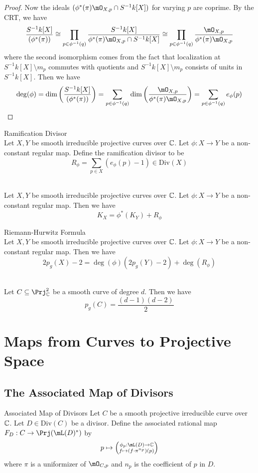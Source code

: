 \documentclass[a4paper]{article}
\begin{document}
\begin{prp}{}{}
\begin{proof}
Now the ideals $(\phi^\ast(\pi)\mO_{X,p}\cap S^{-1}k[X])$ for varying $p$ are coprime. By the CRT, we have $$\frac{S^{-1}k[X]}{(\phi^\ast(\pi))}\cong\prod_{p\in\phi^{-1}(q)}\frac{S^{-1}k[X]}{\phi^\ast(\pi)\mO_{X,p}\cap S^{-1}k[X]}\cong\prod_{p\in\phi^{-1}(q)}\frac{\mO_{X,p}}{\phi^\ast(\pi)\mO_{X,p}}$$ where the second isomorphism comes from the fact that localization at $S^{-1}k[X]\setminus m_p$ commutes with quotients and $S^{-1}k[X]\setminus m_p$ consists of units in $S^{-1}k[X]$. Then we have $$\deg(\phi)=\dim\left(\frac{S^{-1}k[X]}{(\phi^\ast(\pi))}\right)=\sum_{p\in\phi^{-1}(q)}\dim\left(\frac{\mO_{X,p}}{\phi^\ast(\pi)\mO_{X,p}}\right)=\sum_{p\in\phi^{-1}(q)}e_\phi(p)$$
\end{proof}
\end{prp}

\begin{defn}{Ramification Divisor}{}\\
Let $X,Y$ be smooth irreducible projective curves over $\mathbb{C}$. Let $\phi:X\to Y$ be a non-constant regular map. Define the ramification divisor to be $$R_\phi=\sum_{p\in X}(e_\phi(p)-1)\in\text{Div}(X)$$
\end{defn}

\begin{prp}{}{}\\
Let $X,Y$ be smooth irreducible projective curves over $\mathbb{C}$. Let $\phi:X\to Y$ be a non-constant regular map. Then we have $$K_X=\phi^\ast(K_Y)+R_\phi$$
\end{prp}

\begin{thm}{Riemann-Hurwitz Formula}{}\\
Let $X,Y$ be smooth irreducible projective curves over $\mathbb{C}$. Let $\phi:X\to Y$ be a non-constant regular map. Then we have $$2p_g(X)-2=\deg(\phi)(2p_g(Y)-2)+\deg(R_\phi)$$
\end{thm}

\begin{prp}{}{}\\
Let $C\subseteq\Prj_\C^2$ be a smooth curve of degree $d$. Then we have $$p_g(C)=\frac{(d-1)(d-2)}{2}$$
\end{prp}

\pagebreak
\section{Maps from Curves to Projective Space}
\subsection{The Associated Map of Divisors}
\begin{defn}{Associated Map of Divisors}{} Let $C$ be a smooth projective irreducible curve over $\mathbb{C}$. Let $D\in\text{Div}(C)$ be a divisor. Define the associated rational map $F_D:C\to\Prj(\mL(D)^\ast)$ by $$p\mapsto\left(\substack{\phi_p:\mL(D)\to\C\\f\mapsto(f\cdot\pi^{n_p})(p)}\right)$$ where $\pi$ is a uniformizer of $\mO_{C,p}$ and $n_p$ is the coefficient of $p$ in $D$. 
\end{defn}
\end{document}
